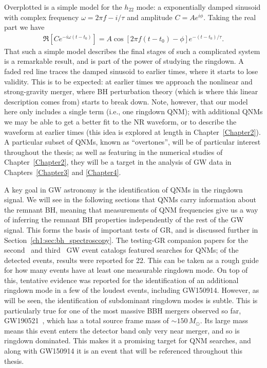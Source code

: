 Overplotted is a simple model for the $h_{22}$ mode: a exponentially damped sinusoid with complex frequency $\omega = 2\pi f - i/\tau$ and amplitude $C = Ae^{i\phi}$. 
Taking the real part we have
\begin{align}
    \Re[Ce^{-i\omega(t-t_0)}] = A\cos[2\pi f(t-t_0) - \phi]e^{-(t-t_0)/\tau}.
\end{align}
That such a simple model describes the final stages of such a complicated system is a remarkable result, and is part of the power of studying the ringdown.
A faded red line traces the damped sinusoid to earlier times, where it starts to lose validity.
This is to be expected: at earlier times we approach the nonlinear and strong-gravity merger, where BH perturbation theory (which is where this linear description comes from) starts to break down.
Note, however, that our model here only includes a single term (i.e., one ringdown QNM); with additional QNMs we may be able to get a better fit to the NR waveform, or to describe the waveform at earlier times (this idea is explored at length in Chapter~\ref{Chapter2}).
A particular subset of QNMs, known as ``overtones'', will be of particular interest throughout the thesis; as well as featuring in the numerical studies of Chapter~\ref{Chapter2}, they will be a target in the analysis of GW data in Chapters~\ref{Chapter3} and \ref{Chapter4}.

A key goal in GW astronomy is the identification of QNMs in the ringdown signal.
We will see in the following sections that QNMs carry information about the remnant BH, meaning that measurements of QNM frequencies give us a way of inferring the remnant BH properties independently of the rest of the GW signal.
This forms the basis of important tests of GR, and is discussed further in Section~\ref{ch1:sec:bh_spectroscopy}.
The testing-GR companion papers for the second~\cite{LIGOScientific:2020tif} and third~\cite{LIGOScientific:2021sio} GW event catalogs featured searches for QNMs; of the detected events, results were reported for 22.
This can be taken as a rough guide for how many events have at least one measurable ringdown mode.
On top of this, tentative evidence was reported for the identification of an additional ringdown mode in a few of the loudest events, including GW150914.
However, as will be seen, the identification of subdominant ringdown modes is subtle.
This is particularly true for one of the most massive BBH mergers observed so far, GW190521~\cite{LIGOScientific:2020iuh}, which has a total source frame mass of $\sim 150\,M_\odot$.
Its large mass means this event enters the detector band only very near merger, and so is ringdown dominated.
This makes it a promising target for QNM searches, and along with GW150914 it is an event that will be referenced throughout this thesis. 

